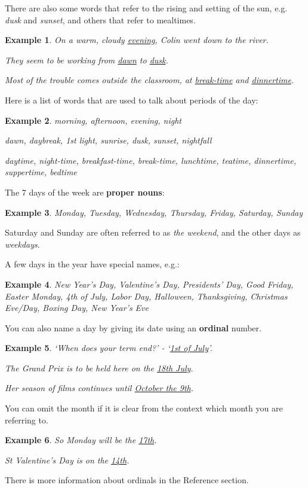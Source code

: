 \documentclass[oneside]{book}
\numberwithin{equation}{section}
\newtheorem{example}{Example}[section]
\begin{document}
There are also some words that refer to the rising and setting of the sun, e.g. \textit{dusk} and \textit{sunset}, and others that refer to mealtimes.
\begin{example}
    On a warm, cloudy \underline{evening}, Colin went down to the river.
    
    They seem to be working from \underline{dawn} to \underline{dusk}.
    
    Most of the trouble comes outside the classroom, at \underline{break-time} and \underline{dinnertime}.
\end{example}
Here is a list of words that are used to talk about periods of the day:
\begin{example}
    morning, afternoon, evening, night
    
    dawn, daybreak, 1st light, sunrise, dusk, sunset, nightfall
    
    daytime, night-time, breakfast-time, break-time, lunchtime, teatime, dinnertime, suppertime, bedtime
\end{example}
%
\noindent{} The 7 days of the week are \textbf{proper nouns}:
\begin{example}
    Monday, Tuesday, Wednesday, Thursday, Friday, Saturday, Sunday
\end{example}
Saturday and Sunday are often referred to as \textit{the weekend}, and the other days as \textit{weekdays}.

%
A few days in the year have special names, e.g.:
\begin{example}
    New Year's Day, Valentine's Day, Presidents' Day, Good Friday, Easter Monday, 4th of July, Labor Day, Halloween, Thanksgiving, Christmas Eve/Day, Boxing Day, New Year's Eve
\end{example}
You can also name a day by giving its date using an \textbf{ordinal} number.
\begin{example}
    `When does your term end?' - `\underline{1st of July}'.
    
    The Grand Prix is to be held here on the \underline{18th July}.
    
    Her season of films continues until \underline{October the 9th}.
\end{example}
You can omit the month if it is clear from the context which month you are referring to.
\begin{example}
    So Monday will be the \underline{17th}.
    
    St Valentine's Day is on the \underline{14th}.
\end{example}
There is more information about ordinals in the Reference section.
\end{document}
